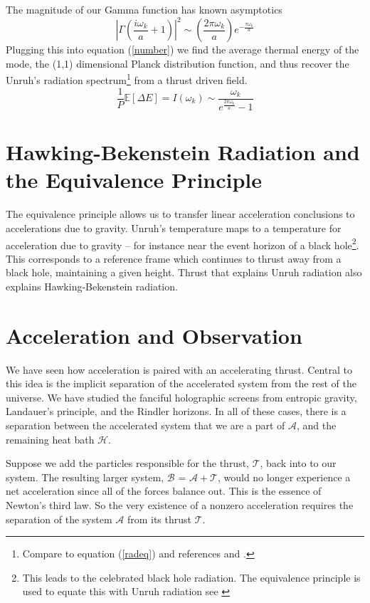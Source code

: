 \documentclass[12pt,a4paper]{article}
\begin{document}
The magnitude of our Gamma function has known asymptotics \cite[Eq.~5.11.9]{NIST:DLMF}
\[
\left|\Gamma\left(\frac{i\omega_k}{a} + 1\right) \right|^2 \sim \left(\frac{2 \pi \omega_k} {a}\right) e^{-\frac{\pi\omega_k}{a}}
\]
Plugging this into equation (\ref{number}) we find the average thermal energy of the mode, the (1,1) dimensional Planck distribution function, and thus recover the Unruh's radiation spectrum\footnote{Compare to equation (\ref{radeq}) and references \cite{unruh} and \cite{Frodden}.} from a thrust driven field.
\[
\frac{1}{P} \mathbb{E}[\Delta E] = I(\omega_k) \sim \frac{\omega_k}{e^{\frac{2 \pi \omega_k}{a}}-1}
\]

\section{Hawking-Bekenstein Radiation and the Equivalence Principle}

The equivalence principle allows us to transfer linear acceleration conclusions to accelerations due to gravity.  Unruh's temperature maps to a temperature for acceleration due to gravity -- for instance near the event horizon of a black hole\footnote{This leads to the celebrated black hole radiation.  The equivalence principle is used to equate this with Unruh radiation see \cite{unruh}}.  This corresponds to a reference frame which continues to thrust away from a black hole, maintaining a given height.  Thrust that explains Unruh radiation also explains Hawking-Bekenstein radiation.

\section{Acceleration and Observation}
We have seen how acceleration is paired with an accelerating thrust.  Central to this idea is the implicit separation of the accelerated system from the rest of the universe.  We have studied the fanciful holographic screens from entropic gravity, Landauer's principle, and the Rindler horizons.  In all of these cases, there is a separation between the accelerated system that we are a part of $\mathcal{A}$, and the remaining heat bath $\mathcal{H}$.

Suppose we add the particles responsible for the thrust, $\mathcal{T}$, back into to our system.  The resulting larger system,  $\mathcal{B}$ = $\mathcal{A} + \mathcal{T}$, would no longer experience a net acceleration since all of the forces balance out.  This is the essence of Newton's third law.  So the very existence of a nonzero acceleration requires the separation of the system $\mathcal{A}$ from its thrust $\mathcal{T}$.
\end{document}

